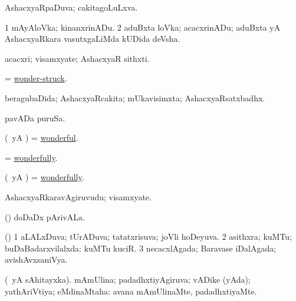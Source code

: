 \bentry
{} 
\gl{\gu}
\expl{}
\bmng
AshacxyaRpaDuva; cakitagoLuLxva. 
\emng
\eentry

\bentry
{} 
\gl{\nA}
\expl{}
\bmng
\bnum
\num{1} mAyAloVka; kinanxrinADu. 
\num{2} aduBxta loVka; acacxrinADu; aduBxta yA AshacxyaRkara vasutxgaLiMda kUDida deVsha. 
\enum
\emng
\eentry

\bentry
{} 
\gl{\nA}
\expl{}
\bmng
acacxri; visamxyate; AshacxyaR sithxti. 
\emng
\eentry

\bentry
{} 
\gl{\gu}
\expl{}
\bmng
= \hyperlink{wonder-struck}{wonder-struck}. 
\emng
\eentry

\bentry
{} 
\gl{\gu}
\expl{}
\bmng
beragubaDida; AshacxyaRcakita; mUkavisimxta; AshacxyaRsatxbadhx. 
\emng
\eentry

\bentry
{} 
\gl{\nA}
\expl{}
\bmng
pavADa puruSa. 
\emng
\eentry

\bentry
{} 
\gl{\gu}
\expl{}
\bmng
(\kAparx\ yA \rUpa) = \hyperlink{wonderful}{wonderful}. 
\emng
\eentry

\bentry
{} 
\gl{\kirxvi}
\expl{}
\bmng
 = \hyperlink{wonderfully}{wonderfully}. 
\emng
\eentry

\bentry
{} 
\gl{\kirxvi}
\expl{}
\bmng
(\kAparx\ yA \rUpa) = \hyperlink{wonderfully}{wonderfully}. 
\emng
\eentry

\bentry
{} 
\gl{\nA}
\bmng
AshacxyaRkaravAgiruvudu; visamxyate. 
\emng
\eentry

\bentry
{} 
\gl{\nA}
\expl{}
\bmng
(\AseTxrXV) doDaDx pArivALa. 
\emng
\eentry

\bentry
{} 
\gl{\gu}
\bmng
(\AmA) 
\bnum
\num{1} aLALxDuva; tUrADuva; tatatxrisuva; joVli hoDeyuva. 
\num{2} asithxra; kuMTu; buDaBadarxvilalxda:  kuMTu kuciR. 
\num{3} necacxlAgada; Baravase iDalAgada; avishAvxsaniVya. 
\enum
\emng
\eentry

\bentry
{} 
\gl{\gu}
\expl{}
\bmng
(\pArxparx\ yA sAhitayxka). mAmUlina; padadhxtiyAgiruva; vADike (yAda); yathAriVtiya; eMdinaMtaha:  avana mAmUlinaMte, padadhxtiyaMte. 
\emng

